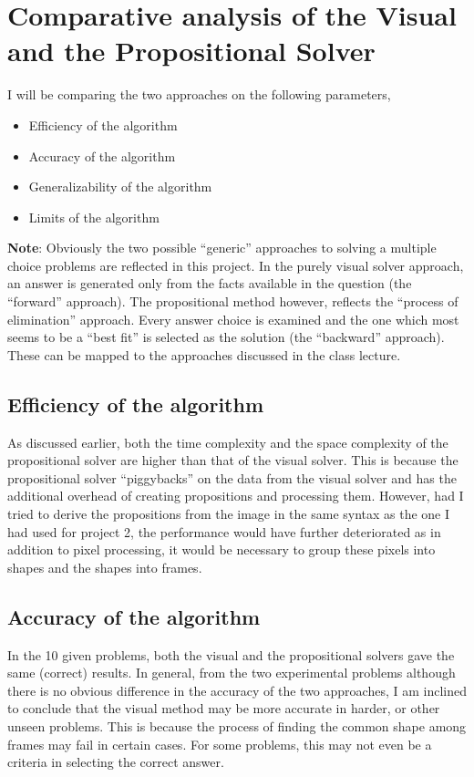 \documentclass[10pt, letter]{article}
\begin{document}
\section{Comparative analysis of the Visual and the Propositional Solver}
I will be comparing the two approaches on the following parameters,
\begin{itemize}
	\item Efficiency of the algorithm
	\item Accuracy of the algorithm
	\item Generalizability of the algorithm
	\item Limits of the algorithm
\end{itemize}

\textbf{Note}: Obviously the two possible ``generic'' approaches to solving a multiple choice problems are reflected in this project. In the purely visual solver approach, an answer is generated only from the facts available in the question (the ``forward'' approach). The propositional method however, reflects the ``process of elimination'' approach. Every answer choice is examined and the one which most seems to be a ``best fit'' is selected as the solution (the ``backward'' approach). These can be mapped to the approaches discussed in the class lecture.

\subsection*{Efficiency of the algorithm}
As discussed earlier, both the time complexity and the space complexity of the propositional solver are higher than that of the visual solver. This is because the propositional solver ``piggybacks'' on the data from the visual solver and has the additional overhead of creating propositions and processing them. However, had I tried to derive the propositions from the image in the same syntax as the one I had used for project 2, the performance would have further deteriorated as in addition to pixel processing, it would be necessary to group these pixels into shapes and the shapes into frames.

\subsection*{Accuracy of the algorithm}
In the 10 given problems, both the visual and the propositional solvers gave the same (correct) results. In general, from the two experimental problems although there is no obvious difference in the accuracy of the two approaches, I am inclined to conclude that the visual method may be more accurate in harder, or other unseen problems. This is because the process of finding the common shape among frames may fail in certain cases. For some problems, this may not even be a criteria in selecting the correct answer.
\end{document}
